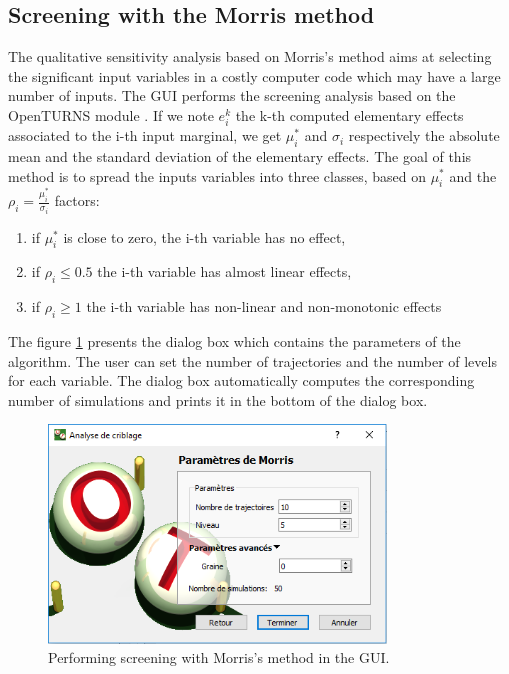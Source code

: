 \documentclass{article}
\begin{document}
\subsection{Screening with the Morris method}

The qualitative sensitivity analysis based on Morris's method \cite{Morris1991} aims at 
selecting the significant input variables in a costly computer code which may have 
a large number of inputs. 
The GUI performs the screening analysis based on the OpenTURNS  module \cite{otmorris}. 
If we note $e_i^k$ the k-th computed elementary effects associated to the i-th input marginal, 
we get $\mu_i^*$ and $\sigma_i$ respectively the absolute mean and the standard deviation of the elementary effects. 
The goal of this method is to spread the inputs variables into three classes, based on $\mu_i^*$ 
and the $\rho_i = \frac{\mu_i^*}{\sigma_i}$ factors:
\begin{enumerate}
\item if $\mu_i^*$ is close to zero, the i-th variable has no effect,
\item if $\rho_i \leq 0.5$ the i-th variable has almost linear effects,
\item if $\rho_i \geq 1$ the i-th variable has non-linear and non-monotonic effects
\end{enumerate}

The figure \ref{fig-morris} presents the dialog box which contains the parameters of the 
algorithm. 
The user can set the number of trajectories and the number of levels for each variable. 
The dialog box automatically computes the corresponding number of simulations and prints 
it in the bottom of the dialog box. 

\begin{figure}
\centering
\includegraphics[width=0.8\textwidth]{figures/otgui-criblage-parameters.png}
\caption{Performing screening with Morris's method in the GUI.}
\label{fig-morris}
\end{figure}
\end{document}
